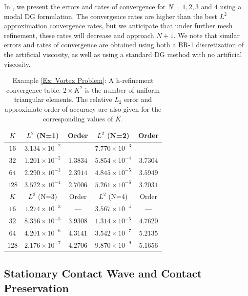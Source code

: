 \documentclass{elsarticle}
\theoremstyle{definition}
\theoremstyle{plain}
\theoremstyle{plain}
\begin{document}
In , we present the errors and rates of convergence for $N = 1,2,3$ and $4$ using a modal DG formulation. The convergence rates are higher than the best $L^2$ approximation convergence rates, but we anticipate that under further mesh refinement, these rates will decrease and approach $N+1$. 
We note that similar errors and rates of convergence are obtained using both a BR-1 discretization of the artificial viscosity, as well as using a standard DG method with no artificial viscosity. 

\begin{table}[tbp]
\centering

\begin{tabular}{|c|c|c|c|c|}
\hline
$K$ & $L^2$ (N=1) & Order & $L^2$ (N=2) & Order \\
\hline
$16$ & $3.134 \times 10^{ -2 }$ & --- & $7.770 \times 10^{ -3 }$ & --- \\
$32$ & $1.201 \times 10^{ -2 }$ & $1.3834$ & $5.854 \times 10^{ -4 }$ & $3.7304$ \\
$64$ & $2.290 \times 10^{ -3 }$ & $2.3914$ & $4.845 \times 10^{ -5 }$ & $3.5949$ \\
$128$ & $3.522 \times 10^{ -4 }$ & $2.7006$ & $5.261 \times 10^{ -6 }$ & $3.2031$ \\
\hline
$K$ & $L^2$ (N=3) & Order & $L^2$ (N=4) & Order \\
\hline
$16$ & $1.274 \times 10^{ -3 }$ & --- & $3.567 \times 10^{ -4 }$ & --- \\
$32$ & $8.356 \times 10^{ -5 }$ & $3.9308$ & $1.314 \times 10^{ -5 }$ & $4.7620$ \\
$64$ & $4.201 \times 10^{ -6 }$ & $4.3141$ & $3.542 \times 10^{ -7 }$ & $5.2135$ \\
$128$ & $2.176 \times 10^{ -7 }$ & $4.2706$ & $9.870 \times 10^{ -9 }$ & $5.1656$ \\
\hline
\end{tabular}

\caption{Example \ref{Ex: Vortex Problem}: A h-refinement convergence table. $2 \times K^2$ is the number of uniform triangular elements. The relative $L_2$ error and approximate order of accuracy are also given for the corresponding values of $K$.}
\label{table:Shu Isentropic Vortex}
\end{table}

\subsection{Stationary Contact Wave and Contact Preservation} \label{ex: stationary contact wave}
\end{document}

